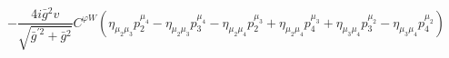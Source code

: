 %
\begin{dmath*}
%
  -  \frac{4 i {\bar g}{}^2 v}{\sqrt{{\bar g}^{\prime 2} + {\bar g}{}^2}}C^{ \varphi  W} \left(\eta_{\mu_2 \mu_3} p_2^{\mu_4} - \eta_{\mu_2 \mu_3} p_3^{\mu_4} - \eta_{\mu_2 \mu_4} p_2^{\mu_3} + \eta_{\mu_2 \mu_4} p_4^{\mu_3} + \eta_{\mu_3 \mu_4} p_3^{\mu_2} - \eta_{\mu_3 \mu_4} p_4^{\mu_2}\right)
%
\end{dmath*}
%
